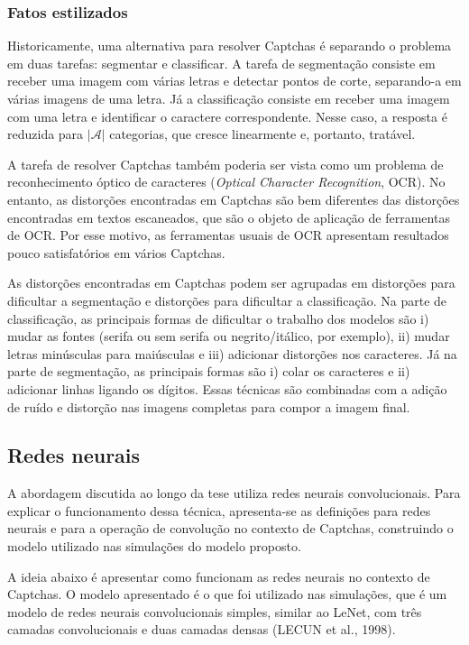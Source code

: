 \documentclass[12pt,twoside,brazilian]{book}
\begin{document}
\hypertarget{fatos-estilizados}{%
\subsubsection{Fatos estilizados}\label{fatos-estilizados}}

Historicamente, uma alternativa para resolver Captchas é separando o
problema em duas tarefas: segmentar e classificar. A tarefa de
segmentação consiste em receber uma imagem com várias letras e detectar
pontos de corte, separando-a em várias imagens de uma letra. Já a
classificação consiste em receber uma imagem com uma letra e identificar
o caractere correspondente. Nesse caso, a resposta é reduzida para
\(|\mathcal A|\) categorias, que cresce linearmente e, portanto,
tratável.

A tarefa de resolver Captchas também poderia ser vista como um problema
de reconhecimento óptico de caracteres (\emph{Optical Character
Recognition}, OCR). No entanto, as distorções encontradas em Captchas
são bem diferentes das distorções encontradas em textos escaneados, que
são o objeto de aplicação de ferramentas de OCR. Por esse motivo, as
ferramentas usuais de OCR apresentam resultados pouco satisfatórios em
vários Captchas.

As distorções encontradas em Captchas podem ser agrupadas em distorções
para dificultar a segmentação e distorções para dificultar a
classificação. Na parte de classificação, as principais formas de
dificultar o trabalho dos modelos são i) mudar as fontes (serifa ou sem
serifa ou negrito/itálico, por exemplo), ii) mudar letras minúsculas
para maiúsculas e iii) adicionar distorções nos caracteres. Já na parte
de segmentação, as principais formas são i) colar os caracteres e ii)
adicionar linhas ligando os dígitos. Essas técnicas são combinadas com a
adição de ruído e distorção nas imagens completas para compor a imagem
final.

\hypertarget{redes-neurais}{%
\subsection{Redes neurais}\label{redes-neurais}}

A abordagem discutida ao longo da tese utiliza redes neurais
convolucionais. Para explicar o funcionamento dessa técnica,
apresenta-se as definições para redes neurais e para a operação de
convolução no contexto de Captchas, construindo o modelo utilizado nas
simulações do modelo proposto.

A ideia abaixo é apresentar como funcionam as redes neurais no contexto
de Captchas. O modelo apresentado é o que foi utilizado nas simulações,
que é um modelo de redes neurais convolucionais simples, similar ao
LeNet, com três camadas convolucionais e duas camadas densas (LECUN et
al., 1998).
\end{document}

